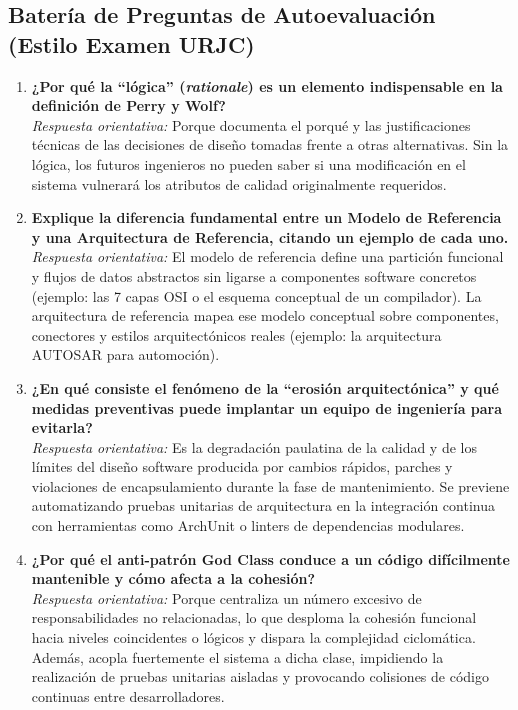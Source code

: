 \subsection{Batería de Preguntas de Autoevaluación (Estilo Examen URJC)}

\begin{enumerate}[leftmargin=1.8em]
  \item \textbf{¿Por qué la ``lógica'' (\emph{rationale}) es un elemento indispensable en la definición de Perry y Wolf?} \\
  \emph{Respuesta orientativa:} Porque documenta el porqué y las justificaciones técnicas de las decisiones de diseño tomadas frente a otras alternativas. Sin la lógica, los futuros ingenieros no pueden saber si una modificación en el sistema vulnerará los atributos de calidad originalmente requeridos.

  \item \textbf{Explique la diferencia fundamental entre un Modelo de Referencia y una Arquitectura de Referencia, citando un ejemplo de cada uno.} \\
  \emph{Respuesta orientativa:} El modelo de referencia define una partición funcional y flujos de datos abstractos sin ligarse a componentes software concretos (ejemplo: las 7 capas OSI o el esquema conceptual de un compilador). La arquitectura de referencia mapea ese modelo conceptual sobre componentes, conectores y estilos arquitectónicos reales (ejemplo: la arquitectura AUTOSAR para automoción).

  \item \textbf{¿En qué consiste el fenómeno de la ``erosión arquitectónica'' y qué medidas preventivas puede implantar un equipo de ingeniería para evitarla?} \\
  \emph{Respuesta orientativa:} Es la degradación paulatina de la calidad y de los límites del diseño software producida por cambios rápidos, parches y violaciones de encapsulamiento durante la fase de mantenimiento. Se previene automatizando pruebas unitarias de arquitectura en la integración continua con herramientas como ArchUnit o linters de dependencias modulares.

  \item \textbf{¿Por qué el anti-patrón God Class conduce a un código difícilmente mantenible y cómo afecta a la cohesión?} \\
  \emph{Respuesta orientativa:} Porque centraliza un número excesivo de responsabilidades no relacionadas, lo que desploma la cohesión funcional hacia niveles coincidentes o lógicos y dispara la complejidad ciclomática. Además, acopla fuertemente el sistema a dicha clase, impidiendo la realización de pruebas unitarias aisladas y provocando colisiones de código continuas entre desarrolladores.


\end{enumerate}
